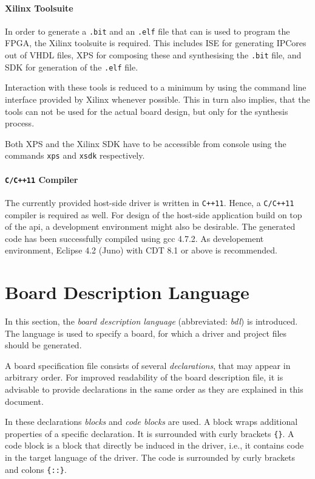 \documentclass{report}
\begin{document}
\paragraph{Xilinx Toolsuite}
In order to generate a \texttt{.bit} and an \texttt{.elf} file that can is used to program the FPGA, the Xilinx toolsuite is required. This includes ISE for generating IPCores out of VHDL files, XPS for composing these and synthesising the \texttt{.bit} file, and SDK for generation of the \texttt{.elf} file.

Interaction with these tools is reduced to a minimum by using the command line interface provided by Xilinx whenever possible. This in turn also implies, that the tools can not be used for the actual board design, but only for the synthesis process.

Both XPS and the Xilinx SDK have to be accessible from console using the commands \texttt{xps} and \texttt{xsdk} respectively.

\paragraph{\texttt{C/C++11} Compiler}
The currently provided host-side driver is written in \texttt{C++11}. Hence, a \texttt{C/C++11} compiler is required as well. For design of the host-side application build on top of the api, a development environment might also be desirable. The generated code has been successfully compiled using gcc 4.7.2. As developement environment, Eclipse 4.2 (Juno) with CDT 8.1 or above is recommended.

\section{Board Description Language}
\label{sec:bdl}
In this section, the \textit{board description language} (abbreviated: \textit{bdl}) is introduced. The language is used to specify a board, for which a driver and project files should be generated. 

A board specification file consists of several \textit{declarations}, that may appear in arbitrary order. For improved readability of the board description file, it is advisable to provide declarations in the same order as they are explained in this document.

In these declarations \textit{blocks} and \textit{code blocks} are used. A block wraps additional properties of a specific declaration. It is surrounded with curly brackets \texttt{\{\}}.
A code block is a block that directly be induced in the driver, i.e., it contains code in the target language of the driver. The code is surrounded by curly brackets and colons \texttt{\{::\}}.
\end{document}

